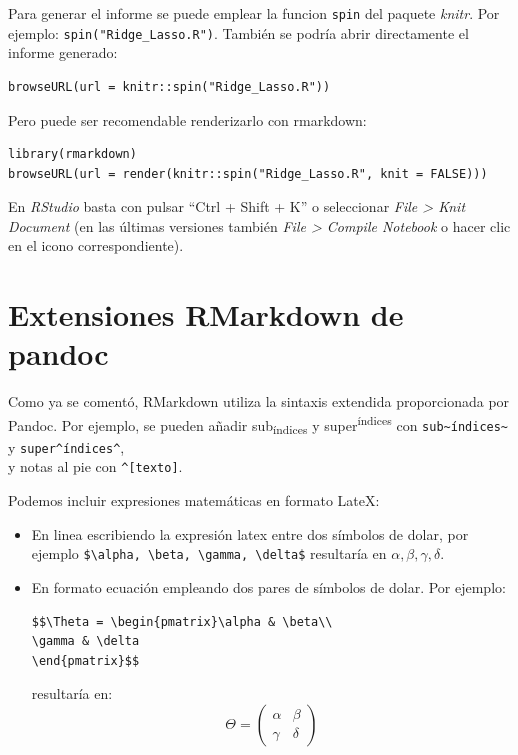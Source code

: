 \documentclass[]{book}
\theoremstyle{definition}
\theoremstyle{definition}
\theoremstyle{definition}
\theoremstyle{remark}
\begin{document}
Para generar el informe se puede emplear la funcion \texttt{spin} del
paquete \emph{knitr}. Por ejemplo: \texttt{spin("Ridge\_Lasso.R")}.
También se podría abrir directamente el informe generado:

\begin{verbatim}
browseURL(url = knitr::spin("Ridge_Lasso.R"))
\end{verbatim}

Pero puede ser recomendable renderizarlo con rmarkdown:

\begin{verbatim}
library(rmarkdown)
browseURL(url = render(knitr::spin("Ridge_Lasso.R", knit = FALSE)))
\end{verbatim}

En \emph{RStudio} basta con pulsar ``Ctrl + Shift + K'' o seleccionar
\emph{File \textgreater{} Knit Document} (en las últimas versiones
también \emph{File \textgreater{} Compile Notebook} o hacer clic en el
icono correspondiente).

\section{Extensiones RMarkdown de
pandoc}\label{extensiones-rmarkdown-de-pandoc}

Como ya se comentó, RMarkdown utiliza la sintaxis extendida
proporcionada por Pandoc. Por ejemplo, se pueden añadir
sub\textsubscript{índices} y super\textsuperscript{índices} con
\texttt{sub\textasciitilde{}índices\textasciitilde{}} y
\texttt{super\^{}índices\^{}},\\
y notas al pie con \texttt{\^{}{[}texto{]}}.

Podemos incluir expresiones matemáticas en formato LateX:

\begin{itemize}
\item
  En linea escribiendo la expresión latex entre dos símbolos de dolar,
  por ejemplo
  \texttt{\$\textbackslash{}alpha,\ \textbackslash{}beta,\ \textbackslash{}gamma,\ \textbackslash{}delta\$}
  resultaría en \(\alpha, \beta, \gamma, \delta\).
\item
  En formato ecuación empleando dos pares de símbolos de dolar. Por
  ejemplo:

\begin{verbatim}
$$\Theta = \begin{pmatrix}\alpha & \beta\\
\gamma & \delta
\end{pmatrix}$$
\end{verbatim}

  resultaría en: \[\Theta = \begin{pmatrix}\alpha & \beta\\
  \gamma & \delta
  \end{pmatrix}\]
\end{itemize}
\end{document}
